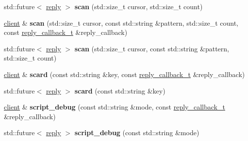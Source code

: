 \begin{DoxyCompactItemize}
\item 
\mbox{\label{classcpp__redis_1_1client_a6bf21e9defd17965b2c1ca9b3db8c539}} 
std\+::future$<$ \hyperlink{classcpp__redis_1_1reply}{reply} $>$ {\bfseries scan} (std\+::size\+\_\+t cursor, std\+::size\+\_\+t count)
\item 
\mbox{\label{classcpp__redis_1_1client_a3711dfc9f6f26899cdbe50b2cabaf36e}} 
\hyperlink{classcpp__redis_1_1client}{client} \& {\bfseries scan} (std\+::size\+\_\+t cursor, const std\+::string \&pattern, std\+::size\+\_\+t count, const \hyperlink{classcpp__redis_1_1client_a061a1140d36d2eaeda82b09a0bb3f9f2}{reply\+\_\+callback\+\_\+t} \&reply\+\_\+callback)
\item 
\mbox{\label{classcpp__redis_1_1client_acd0717c75c4d75108cefc2c9a722527e}} 
std\+::future$<$ \hyperlink{classcpp__redis_1_1reply}{reply} $>$ {\bfseries scan} (std\+::size\+\_\+t cursor, const std\+::string \&pattern, std\+::size\+\_\+t count)
\item 
\mbox{\label{classcpp__redis_1_1client_a4be40b061ee915a236218e5e2fd76206}} 
\hyperlink{classcpp__redis_1_1client}{client} \& {\bfseries scard} (const std\+::string \&key, const \hyperlink{classcpp__redis_1_1client_a061a1140d36d2eaeda82b09a0bb3f9f2}{reply\+\_\+callback\+\_\+t} \&reply\+\_\+callback)
\item 
\mbox{\label{classcpp__redis_1_1client_a089148ca908f563e7b73649aac3bd01e}} 
std\+::future$<$ \hyperlink{classcpp__redis_1_1reply}{reply} $>$ {\bfseries scard} (const std\+::string \&key)
\item 
\mbox{\label{classcpp__redis_1_1client_a6e83ee14e50aef360d7246c2da63b037}} 
\hyperlink{classcpp__redis_1_1client}{client} \& {\bfseries script\+\_\+debug} (const std\+::string \&mode, const \hyperlink{classcpp__redis_1_1client_a061a1140d36d2eaeda82b09a0bb3f9f2}{reply\+\_\+callback\+\_\+t} \&reply\+\_\+callback)
\item 
\mbox{\label{classcpp__redis_1_1client_a336d8dd0da70700d67bac5e71484efff}} 
std\+::future$<$ \hyperlink{classcpp__redis_1_1reply}{reply} $>$ {\bfseries script\+\_\+debug} (const std\+::string \&mode)

\end{DoxyCompactItemize}
